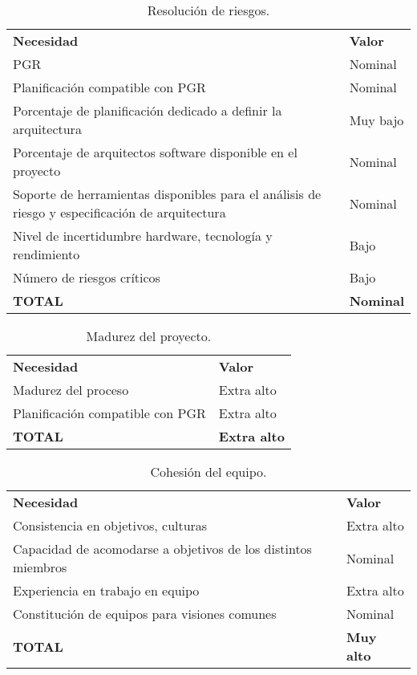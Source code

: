 \begin{table}[h]
\begin{center}
\begin{tabular}{ l l }
\textbf{Necesidad} & \textbf{Valor} \\
PGR  &
Nominal \\
Planificación compatible con PGR  &
Nominal \\
Porcentaje de planificación dedicado a definir la arquitectura &
Muy bajo \\
Porcentaje de arquitectos software disponible en el proyecto &
Nominal \\
Soporte de herramientas disponibles para el análisis de riesgo y especificación de arquitectura &
Nominal \\
Nivel de incertidumbre hardware, tecnología y rendimiento &
Bajo \\
Número de riesgos críticos &
Bajo \\
\textbf{TOTAL} & \textbf{Nominal} \\
\end{tabular}
\caption{Resolución de riesgos.}
\label{tab:riesgos}
\end{center}
\end{table}

\begin{table}[h]
\begin{center}
\begin{tabular}{ l l }
\textbf{Necesidad} & \textbf{Valor} \\
Madurez del proceso&
Extra alto\\
Planificación compatible con PGR &
Extra alto\\
\textbf{TOTAL} & \textbf{Extra alto} \\
\end{tabular}
\caption{Madurez del proyecto.}
\label{tab:madurez}
\end{center}
\end{table}

\begin{table}[h]
\begin{center}
\begin{tabular}{ l l }
\textbf{Necesidad} & \textbf{Valor} \\
Consistencia en objetivos, culturas &
Extra alto\\
Capacidad de acomodarse a objetivos de los distintos miembros &
Nominal\\
Experiencia en trabajo en equipo &
Extra alto\\
Constitución de equipos para visiones comunes &
Nominal\\
\textbf{TOTAL} & \textbf{Muy alto} \\
\end{tabular}
\caption{Cohesión del equipo.}
\label{tab:choseion}
\end{center}
\end{table}

